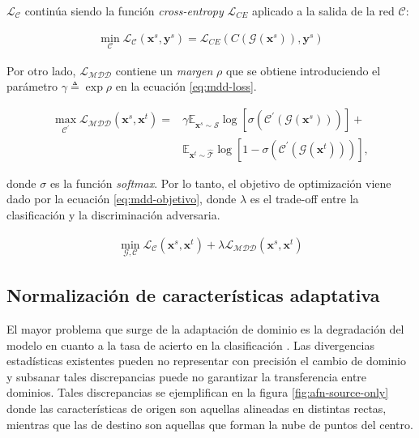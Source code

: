 $\mathcal{L}_{\mathcal{C}}$ continúa siendo la función {\it cross-entropy} $\mathcal{L}_{CE}$ aplicado a la salida de la red $\mathcal{C}$:

\begin{align}
    \min_{\mathcal{C}} \mathcal{L}_\mathcal{C}(\mathbf{x}^s, \mathbf{y}^s) = \mathcal{L}_{CE}(C(\mathcal{G}(\mathbf{x}^s)), \mathbf{y}^s)
    \label{eq:mdd-loss-clasificadora}
\end{align}

Por otro lado, $\mathcal{L}_{\mathcal{MDD}}$ contiene un {\it margen} $\rho$ que se obtiene introduciendo el parámetro
$\gamma \triangleq \exp \rho$ en la ecuación \ref{eq:mdd-loss}.

\begin{align}
    \max_{\mathcal{C}^{'}} \mathcal{L}_{\mathcal{MDD}}(\mathbf{x}^s, \mathbf{x}^t) = & \gamma \mathbb{E}_{\mathbf{x}^s \sim \mathcal{\hat{S}}} \log[\sigma(\mathcal{C}^{'}(\mathcal{G}(\mathbf{x}^s)))] + \nonumber \\
                                                                                     & \mathbb{E}_{\mathbf{x}^t \sim \mathcal{\hat{T}}} \log[1-\sigma(\mathcal{C}^{'}(\mathcal{G}(\mathbf{x}^t)))],
    \label{eq:mdd-loss}
\end{align}

\noindent
donde $\sigma$ es la función {\it softmax}. Por lo tanto, el objetivo de optimización viene dado por la ecuación
\ref{eq:mdd-objetivo}, donde $\lambda$ es el trade-off entre la clasificación y la discriminación adversaria.

\begin{align}
    \min_{\mathcal{G}, \mathcal{C}} \mathcal{L}_{\mathcal{C}}(\mathbf{x}^s, \mathbf{x}^t) + \lambda \mathcal{L}_{\mathcal{MDD}}(\mathbf{x}^s, \mathbf{x}^t)
    \label{eq:mdd-objetivo}
\end{align}

\subsection{Normalización de características adaptativa}

El mayor problema que surge de la adaptación de dominio es la degradación del modelo en cuanto a la tasa de acierto en
la clasificación \parencite{yosinski2014transferable}. Las divergencias estadísticas existentes pueden no representar con precisión el
cambio de dominio y subsanar tales discrepancias puede no garantizar la transferencia entre dominios. Tales
discrepancias se ejemplifican en la figura \ref{fig:afn-source-only} donde las características de origen son aquellas
alineadas en distintas rectas, mientras que las de destino son aquellas que forman la nube de puntos del centro.

